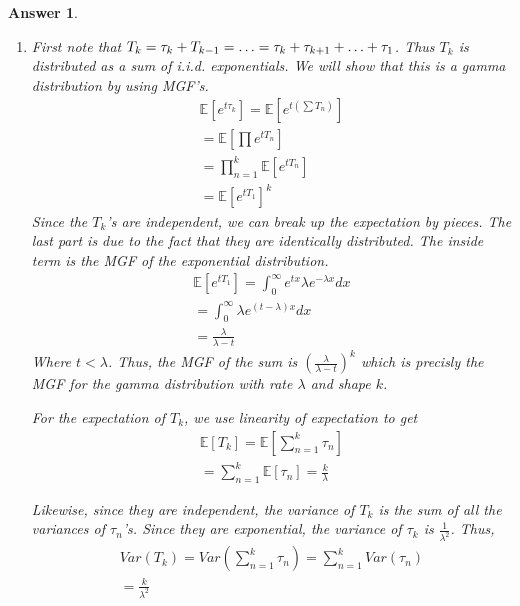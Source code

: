 \documentclass[12pt]{article}
\theoremstyle{colon}
\newtheorem*{answer}{Answer}
\begin{document}
\begin{answer}
\begin{enumerate}[label=\alph*)]
      Which is readily integrated by parts,
      \begin{gather*}
        = \left[ -t e^{- \lambda t} \right]_0^\infty + \int_0^\infty e^{-\lambda t}dt \\
        = 0 - \left[ \frac{e^{- \lambda t}}{\lambda} \right]_0^\infty \\
        = \frac{1}{\lambda}
      \end{gather*}
    \item First note that $T_k = \tau_k + T_{k-1} = \mathellipsis = \tau_k + \tau_{k+1} + \mathellipsis + \tau_1$. Thus $T_k$ is distributed as a sum of i.i.d. exponentials. We will show that this is a gamma distribution by using MGF's.
      \begin{gather*}
        \mathbb{E}[e^{t \tau_k}] = \mathbb{E}[e^{t (\sum T_n)}] \\
        = \mathbb{E}[\prod e^{t T_n} ] \\
        = \prod_{n=1}^k \mathbb{E}[e^{t T_n}] \\
        = \mathbb{E}[e^{t T_1}]^k
      \end{gather*}
      Since the $T_k$'s are independent, we can break up the expectation by pieces. The last part is due to the fact that they are identically distributed. The inside term is the MGF of the exponential distribution.
      \begin{gather*}
        \mathbb{E}[e^{t T_1}] = \int_0^\infty e^{t x} \lambda e^{-\lambda x} dx \\
        = \int_0^\infty \lambda e^{(t-\lambda) x} dx \\
        = \frac{\lambda}{\lambda-t}
      \end{gather*}
      Where $t < \lambda$.
      Thus, the MGF of the sum is $\left( \frac{\lambda}{\lambda-t} \right)^k$ which is precisly the MGF for the gamma distribution with rate $\lambda$ and shape $k$.

      For the expectation of $T_k$, we use linearity of expectation to get
      \begin{gather*}
        \mathbb{E}[T_k] = \mathbb{E}[\sum_{n = 1}^k \tau_n] \\
        = \sum_{n = 1}^k \mathbb{E}[\tau_n] = \frac{k}{\lambda}
      \end{gather*}

      Likewise, since they are independent, the variance of $T_k$ is the sum of all the variances of $\tau_n$'s. Since they are exponential, the variance of $\tau_k$ is $\frac{1}{\lambda^2}$. Thus,
      \begin{gather*}
        Var(T_k) = Var(\sum_{n = 1}^k \tau_n) = \sum_{n = 1}^k Var(\tau_n) \\
        = \frac{k}{\lambda^2}
      \end{gather*}
  \end{enumerate}
\end{answer}
\end{document}
